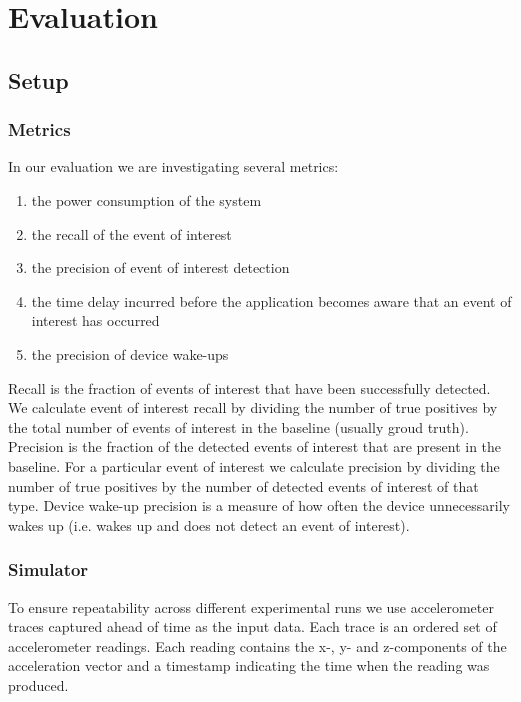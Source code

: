 \section{Evaluation}
\label{sec:evaluation}

\subsection{Setup}

\subsubsection{Metrics}
In our evaluation we are investigating several metrics:

\begin{enumerate}
\setlength{\itemsep}{-3pt}  

\item the power consumption of the system

\item the recall of the event of interest

\item the precision of event of interest detection

\item the time delay incurred before the application becomes aware that an event of interest has occurred

\item the precision of device wake-ups

\end{enumerate}

Recall is the fraction of events of interest that have been successfully detected. We calculate event of interest recall by dividing the number of true positives by the total number of events of interest in the baseline (usually groud truth). Precision is the fraction of the detected events of interest that are present in the baseline. For a particular event of interest we calculate precision by dividing the number of true positives by the number of detected events of interest of that type. Device wake-up precision is a measure of how often the device unnecessarily wakes up (i.e. wakes up and does not detect an event of interest).

\subsubsection{Simulator}

To ensure repeatability across different experimental runs we use accelerometer traces 
captured ahead of time as the input data. Each trace is an ordered set of accelerometer 
readings. Each reading contains the x-, y- and z-components of the acceleration vector and 
a timestamp indicating the time when the reading was produced.

